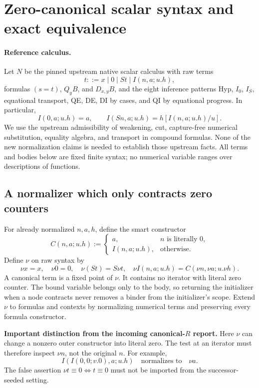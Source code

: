 
\section{Zero-canonical scalar syntax and exact equivalence}
\label{zeroI:section}

\paragraph{Reference calculus.}
Let $N$ be the pinned upstream native scalar calculus with raw terms
\[
 t::=x\mid 0\mid St\mid I(n,a;u.h),
\]
formulas $(s=t)$, $Q_yB$, and $D_{x,y}B$, and the eight inference patterns
Hyp, $I_0$, $I_S$, equational transport, QE, DE, DI by cases, and QI by
equational progress.  In particular,
\[
 I(0,a;u.h)=a,\qquad
 I(Sn,a;u.h)=h[I(n,a;u.h)/u].
\]
We use the upstream admissibility of weakening, cut, capture-free numerical
substitution, equality algebra, and transport in compound formulas.  None
of the new normalization claims is needed to establish those upstream
facts.  All terms and bodies below are fixed finite syntax; no numerical
variable ranges over descriptions of functions.

\subsection{A normalizer which only contracts zero counters}

For already normalized $n,a,h$, define the smart constructor
\[
 C(n,a;u.h):=
 \begin{cases}
 a,&n\text{ is literally }0,\\
 I(n,a;u.h),&\text{otherwise}.
 \end{cases}
\]
Define $\nu$ on raw syntax by
\[
 \nu x=x,\quad \nu0=0,\quad \nu(St)=S\nu t,\quad
 \nu I(n,a;u.h)=C(\nu n,\nu a;u.\nu h).
\]
A canonical term is a fixed point of $\nu$.  It contains no iterator with
literal zero counter.  The bound variable belongs only to the body, so
returning the initializer when a node contracts never removes a binder
from the initializer's scope.  Extend $\nu$ to formulas and contexts by
normalizing numerical terms and preserving every formula constructor.

\textbf{Important distinction from the incoming canonical-$R$ report.}
Here $\nu$ can change a nonzero outer constructor into literal zero.  The
test at an iterator must therefore inspect $\nu n$, not the original $n$.
For example,
\[
 I(I(0,0;v.0),a;u.h)
 \quad\text{normalizes to}\quad \nu a.
\]
The false assertion $\nu t\equiv0\Longleftrightarrow t\equiv0$ must not be
imported from the successor-seeded setting.

